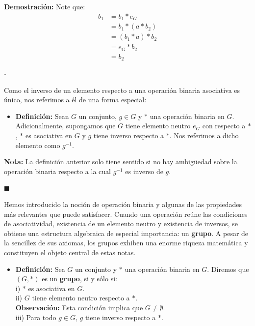 \documentclass[10 pt]{article}
\begin{document}
\Large{\textbf{Demostración:} Note que:}
\begin{align*}
    b_1&=b_1*e_G \\
    &=b_1*(a *b_2) \\
    &=(b_1*a)*b_2 \\
    &=e_G*b_2 \\
    &=b_2
\end{align*}

\begin{flushright}
    $\square$
\end{flushright}

\Large{Como el inverso de un elemento respecto a una operación binaria asociativa es único, nos referimos a él de una forma especial:} \\

\begin{itemize}
    \item \Large{\textbf{Definición:} Sean $G$ un conjunto, $g \in G$ y $*$ una operación binaria en $G$. Adicionalmente, supongamos que $G$ tiene elemento neutro $e_G$ con respecto a $*$, $*$ es asociativa en $G$ y $g$ tiene inverso respecto a $*$. Nos referimos a dicho elemento como \underline{$g^{-1}$}.} \\
\end{itemize}

\Large{\textbf{Nota:} La definición anterior solo tiene sentido si no hay ambigüedad sobre la operación binaria respecto a la cual $g^{-1}$ es inverso de $g$.} \\

\begin{flushright}
    $\blacksquare$
\end{flushright}

\Large{Hemos introducido la noción de operación binaria y algunas de las propiedades más relevantes que puede satisfacer. Cuando una operación reúne las condiciones de asociatividad, existencia de un elemento neutro y existencia de inversos, se obtiene una estructura algebraica de especial importancia: un \textbf{grupo}. A pesar de la sencillez de sus axiomas, los grupos exhiben una enorme riqueza matemática y constituyen el objeto central de estas notas.} \\

\begin{itemize}
    \item \Large{\textbf{Definición:} Sea $G$ un conjunto y $*$ una operación binaria en $G$. Diremos que $(G,*)$ es un \textbf{grupo}, si y sólo si: \\

    i) $*$ es asociativa en $G$. \\

    ii) $G$ tiene elemento neutro respecto a $*$. \\

    \textbf{Observación:} Esta condición implica que $G \neq \emptyset$. \\

    iii) Para todo $g \in G$, $g$ tiene inverso respecto a $*$.} \\
\end{itemize}
\end{document}
